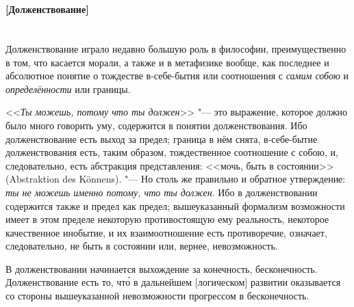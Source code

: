 \paragraph[Примечание. Долженствование]%
{\nopagebreak\\\vspace{1mm}
\footnotesize [Долженствование]\\\vspace{2mm}\\}

Долженствование играло недавно большую роль в философии, преимущественно в
том, что касается морали, а также и в метафизике вообще, как последнее и
абсолютное понятие о тождестве в-себе-бытия или соотношения с
{\em самим собою} и {\em определённости} или границы.

<<{\em Ты можешь, потому что ты должен}>> "--- это выражение,
которое должно было много говорить уму, содержится в понятии долженствования.
Ибо долженствование есть выход за предел; граница в нём снята, в-себе-бытие
долженствования есть, таким образом, тождественное соотношение с собою, и,
следовательно, есть абстракция представления: <<мочь, быть в состоянии>>
(Abstraktion des Könnens). "--- Но столь же правильно и обратное утверждение:
{\em ты не можешь именно потому, что ты должен}. Ибо в
долженствовании содержится также и предел как предел; вышеуказанный
формализм возможности имеет в этом пределе некоторую противостоящую ему
реальность, некоторое качественное инобытие, и их взаимоотношение есть
противоречие, означает, следовательно, не быть в состоянии или, вернее,
невозможность.

В долженствовании начинается выхождение за конечность, бесконечность.
Долженствование есть то, чт\'{о} в дальнейшем [логическом] развитии оказывается
со стороны вышеуказанной невозможности прогрессом в бесконечность.

